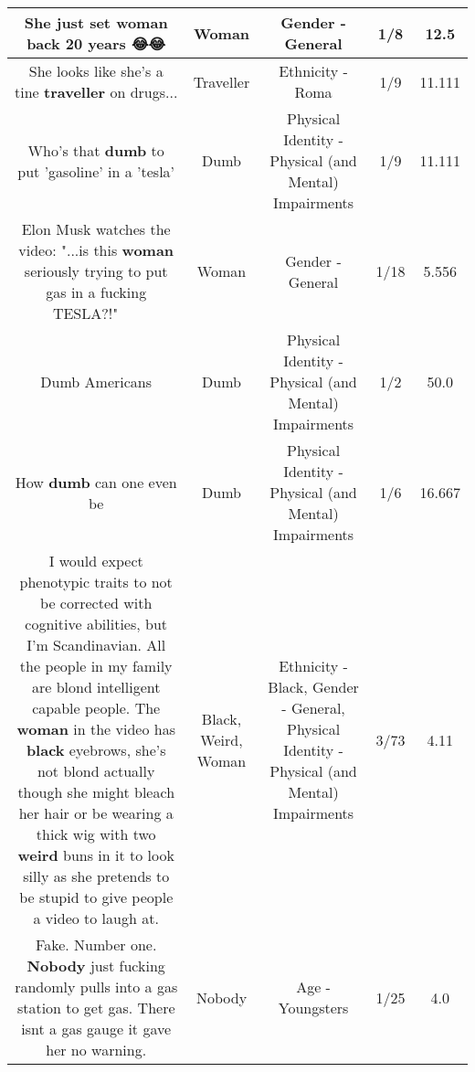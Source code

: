 \documentclass[11pt]{article}
\newlength\mylength
\begin{document}
\begin{center}
\begin{longtable}{|C{.65\mylength}|C{.30\mylength}|C{.12\mylength}|C{.12\mylength}|C{.12\mylength}|}
  \small She just set \textbf{woman} back 20 years 😂😂\normalsize   & Woman & Gender - General & 1/8 & 12.5 \\  \hline
  \small She looks like she's a tine \textbf{traveller} on drugs...\normalsize   & Traveller & Ethnicity - Roma & 1/9 & 11.111 \\  \hline
  \small Who's that \textbf{dumb} to put 'gasoline' in a 'tesla'\normalsize   & Dumb & Physical Identity - Physical (and Mental) Impairments & 1/9 & 11.111 \\  \hline
  \small Elon Musk watches the video: "...is this \textbf{woman} seriously trying to put gas in a fucking TESLA?!" 🤣🤣🤣🤣\normalsize   & Woman & Gender - General & 1/18 & 5.556 \\  \hline
  \small Dumb Americans\normalsize   & Dumb & Physical Identity - Physical (and Mental) Impairments & 1/2 & 50.0 \\  \hline
  \small How \textbf{dumb} can one even be\normalsize   & Dumb & Physical Identity - Physical (and Mental) Impairments & 1/6 & 16.667 \\  \hline
  \small I would expect phenotypic traits to not be corrected with cognitive abilities, but I'm Scandinavian.  All the people in my family are blond intelligent capable people.  The \textbf{woman} in the video has \textbf{black} eyebrows, she's not blond actually though she might bleach her hair or be wearing a thick wig with two \textbf{weird} buns in it to look silly as she pretends to be stupid to give people a video to laugh at.\normalsize   & Black, Weird, Woman & Ethnicity - Black, Gender - General, Physical Identity - Physical (and Mental) Impairments & 3/73 & 4.11 \\  \hline
  \small Fake. Number one. \textbf{Nobody} just fucking randomly pulls into a gas station to get gas. There isnt a gas gauge it gave her no warning.\normalsize   & Nobody & Age - Youngsters & 1/25 & 4.0 \\  \hline

\end{longtable}
\end{center}
\end{document}
